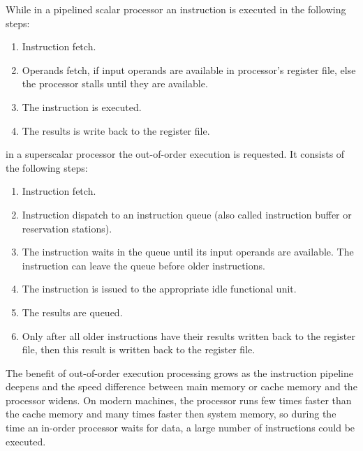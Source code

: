 While in a pipelined scalar processor an instruction is executed in the following steps:
\begin{enumerate}
\item Instruction fetch.
\item Operands fetch, if input operands are available in processor's register file, else the processor stalls until they are available.
\item The instruction is executed.
\item The results is write back to the register file.
\end{enumerate}
in a superscalar processor the out-of-order execution is requested. It consists of the following steps:
\begin{enumerate}
\item Instruction fetch.
\item Instruction dispatch to an instruction queue (also called instruction buffer or reservation stations).
\item The instruction waits in the queue until its input operands are available. The instruction can leave the queue before older instructions.
\item The instruction is issued to the appropriate idle functional unit.
\item The results are queued.
\item Only after all older instructions have their results written back to the register file, then this result is written back to the register file.
\end{enumerate}

The benefit of out-of-order execution processing grows as the instruction pipeline deepens and the speed difference between main memory or cache memory and the processor widens. On modern machines, the processor runs few times faster than the cache memory and many times faster then system memory, so during the time an in-order processor  waits for data, a large number of instructions could be executed.

